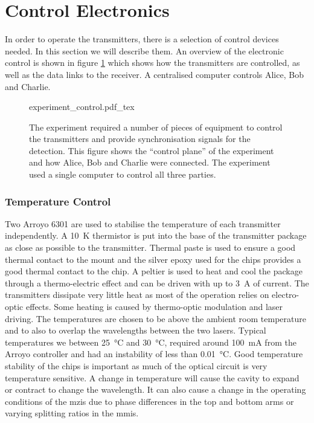 \section{Control Electronics}

In order to operate the transmitters, there is a selection of control devices needed. In this section we will describe them. An overview of the electronic control is shown in figure \ref{fig:exp_control} which shows how the transmitters are controlled, as well as the data links to the receiver. A centralised computer controls Alice, Bob and Charlie. 

\begin{figure}[t]
	\centering
	\large
	\def\svgwidth{\textwidth} 
	{experiment_control.pdf_tex}
	\caption[Control electronic schematic of the MDI-QKD experiment]{The experiment required a number of pieces of equipment to control the transmitters and provide synchronisation signals for the detection. This figure shows the ``control plane'' of the experiment and how Alice, Bob and Charlie were connected. The experiment used a single computer to control all three parties.}
	\label{fig:exp_control}
\end{figure}

\subsubsection*{Temperature Control}

Two Arroyo 6301 are used to stabilise the temperature of each transmitter independently. A \SI{10}{K} thermistor is put into the base of the transmitter package as close as possible to the transmitter. Thermal paste is used to ensure a good thermal contact to the mount and the silver epoxy used for the chips provides a good thermal contact to the chip. A peltier is used to heat and cool the package through a thermo-electric effect and can be driven with up to \SI{3}{A} of current. The transmitters dissipate very little heat as most of the operation relies on electro-optic effects. Some heating is caused by thermo-optic modulation and laser driving. The temperatures are chosen to be above the ambient room temperature and to also to overlap the wavelengths between the two lasers. Typical temperatures we between \SI{25}{\celsius} and \SI{30}{\celsius}, required around \SI{100}{mA} from the Arroyo controller and had an instability of less than \SI{0.01}{\celsius}. Good temperature stability of the chips is important as much of the optical circuit is very temperature sensitive. A change in temperature will cause the cavity to expand or contract to change the wavelength. It can also cause a change in the operating conditions of the \acp{mzi} due to phase differences in the top and bottom arms or varying splitting ratios in the \acp{mmi}.

